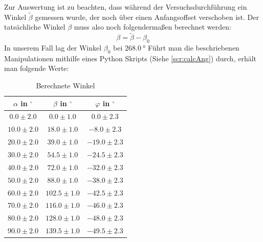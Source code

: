 \documentclass{report}
\begin{document}
Zur Auswertung ist zu beachten, dass während der Versuchsdurchführung ein Winkel $\tilde{\beta}$ gemessen wurde, der noch über einen Anfangsoffset verschoben ist. 
Der tatsächliche Winkel $\beta$ muss also noch folgendermaßen berechnet werden:
\begin{equation}
    \beta = \tilde{\beta} - \beta_0
\end{equation}
In unserem Fall lag der Winkel $\beta_0$ bei $\qty{268.0}{\degree}$
Führt man die beschriebenen Manipulationen mithilfe eines Python Skripts (Siehe \ref{scr:calcAng}) durch, erhält man folgende Werte:
\begin{table}[H]
        \begin{center}
                \begin{tabular}{|c|c|c|}
                        \hline
                        $\alpha$ in $^{\circ}$ & $\beta$ in $^{\circ}$ & $\varphi$ in $^{\circ}$ \\
                        \hline
                        $0.0 \pm 2.0$ & $0.0 \pm 1.0$ & $0.0 \pm 2.3$ \\
                        \hline
                        $10.0 \pm 2.0$ & $18.0 \pm 1.0$ & $-8.0 \pm 2.3$ \\
                        \hline
                        $20.0 \pm 2.0$ & $39.0 \pm 1.0$ & $-19.0 \pm 2.3$ \\
                        \hline
                        $30.0 \pm 2.0$ & $54.5 \pm 1.0$ & $-24.5 \pm 2.3$ \\
                        \hline
                        $40.0 \pm 2.0$ & $72.0 \pm 1.0$ & $-32.0 \pm 2.3$ \\
                        \hline
                        $50.0 \pm 2.0$ & $88.0 \pm 1.0$ & $-38.0 \pm 2.3$ \\
                        \hline
                        $60.0 \pm 2.0$ & $102.5 \pm 1.0$ & $-42.5 \pm 2.3$ \\
                        \hline
                        $70.0 \pm 2.0$ & $116.0 \pm 1.0$ & $-46.0 \pm 2.3$ \\
                        \hline
                        $80.0 \pm 2.0$ & $128.0 \pm 1.0$ & $-48.0 \pm 2.3$ \\
                        \hline
                        $90.0 \pm 2.0$ & $139.5 \pm 1.0$ & $-49.5 \pm 2.3$ \\
                        \hline
                \end{tabular}
        \end{center}
        \caption{Berechnete Winkel}
        \label{tab:angles}
\end{table}
\end{document}
